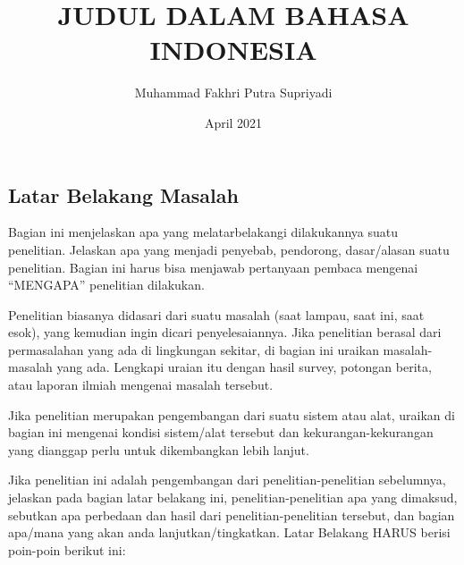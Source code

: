 \documentclass{final_project}
\title{JUDUL DALAM BAHASA INDONESIA}
\author{Muhammad Fakhri Putra Supriyadi}
\date{April 2021}
\begin{document}

%

\addalllist{}


\subsection{Latar Belakang Masalah}

Bagian ini menjelaskan apa yang melatarbelakangi dilakukannya suatu 
penelitian. 
Jelaskan apa yang menjadi penyebab, pendorong, dasar/alasan suatu penelitian. 
Bagian ini harus bisa menjawab pertanyaan pembaca mengenai “MENGAPA” penelitian dilakukan.

Penelitian biasanya didasari dari suatu masalah (saat lampau, saat ini, saat esok), yang kemudian ingin dicari penyelesaiannya. Jika penelitian berasal dari permasalahan yang ada di lingkungan sekitar, di bagian ini uraikan masalah-masalah yang ada. Lengkapi uraian itu dengan hasil survey, potongan berita, atau laporan ilmiah mengenai masalah tersebut.

Jika penelitian merupakan pengembangan dari suatu sistem atau alat, uraikan di bagian ini mengenai kondisi sistem/alat tersebut dan kekurangan-kekurangan yang dianggap perlu untuk dikembangkan lebih lanjut.

Jika penelitian ini adalah pengembangan dari penelitian-penelitian sebelumnya, jelaskan pada bagian latar belakang ini, penelitian-penelitian apa yang dimaksud, sebutkan apa perbedaan dan hasil dari penelitian-penelitian tersebut, dan bagian apa/mana yang akan anda lanjutkan/tingkatkan. Latar Belakang HARUS berisi poin-poin berikut ini:
\end{document}
